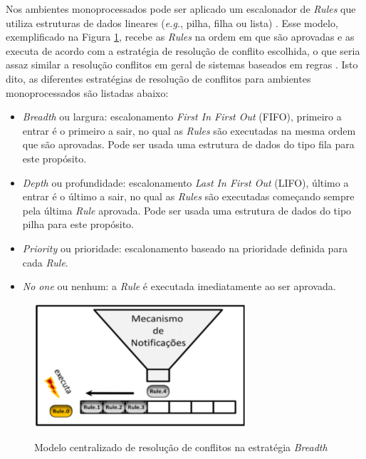 Nos ambientes monoprocessados pode ser aplicado um escalonador de \textit{Rules}
que utiliza estruturas de dados lineares (\textit{e.g.}, pilha, filha ou lista)
\cite{msc_Banaszewski_2009}. Esse modelo, exemplificado na Figura
\ref{fig:conflitos}, recebe as \textit{Rules} na ordem em que são aprovadas e as
executa de acordo com a estratégia de resolução de conflito escolhida, o que
seria assaz similar a resolução conflitos em geral de sistemas baseados em
regras \cite{msc_Banaszewski_2009}. Isto dito, as diferentes estratégias de
resolução de conflitos para ambientes monoprocessados são listadas abaixo:

\begin{itemize}
  \item \textit{Breadth} ou largura: escalonamento \textit{First In First Out}
        (FIFO), primeiro a entrar é o primeiro a sair, no qual as \textit{Rules}
        são executadas na mesma ordem que são aprovadas. Pode ser usada uma
        estrutura de dados do tipo fila para este propósito.
  \item \textit{Depth} ou profundidade: escalonamento \textit{Last In First Out}
        (LIFO), último a entrar é o último a sair, no qual as \textit{Rules}
        são executadas começando sempre pela última \textit{Rule} aprovada. Pode
        ser usada uma estrutura de dados do tipo pilha para este propósito.
  \item \textit{Priority} ou prioridade: escalonamento baseado na prioridade definida para
        cada \textit{Rule}.
  \item \textit{No one} ou nenhum: a \textit{Rule} é executada imediatamente ao ser
        aprovada.
\end{itemize}

\begin{figure}[!htb]
  \centering
  \caption{Modelo centralizado de resolução de conflitos na estratégia
    \textit{Breadth}} \includegraphics[width=0.7\textwidth]{../figures/conflitos.png}
  \smallskip
  \label{fig:conflitos}
\end{figure}

